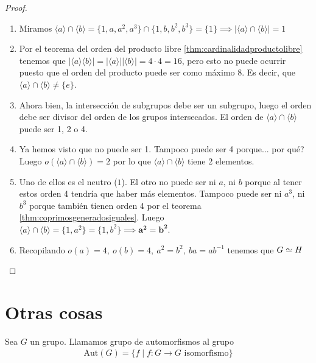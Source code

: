 \documentclass{book}
\theoremstyle{definition}
\theoremstyle{remark}
\newcommand{\inv}[1]{#1^{-1}}
\newcommand{\isom}{\simeq}
\newcommand{\autom}[1]{\text{Aut}(#1)}
\begin{document}
\begin{proof}
\begin{enumerate}
\begin{itemize}
			\begin{enumerate}
				\item Miramos $\langle a \rangle \cap \langle b \rangle = \{1, a, a^2, a^3\} \cap \{1, b, b^2, b^3\} = \{1\} \implies |\langle a \rangle \cap \langle b \rangle| = 1$
				\item Por el teorema del orden del producto libre \ref{thm:cardinalidadproductolibre} tenemos que $|\langle a \rangle \langle b \rangle| = |\langle a \rangle ||\langle b \rangle| = 4 \cdot 4 = 16$, pero esto no puede ocurrir puesto que el orden del producto puede ser como máximo $8$. Es decir, que $\langle a \rangle \cap \langle b \rangle \neq \{e\}$.
				\item Ahora bien, la intersección de subgrupos debe ser un subgrupo, luego el orden debe ser divisor del orden de los grupos intersecados. El orden de $\langle a \rangle \cap \langle b \rangle$ puede ser 1, 2 o 4.
				\item Ya hemos visto que no puede ser 1. Tampoco puede ser 4 porque... por qué? Luego $o(\langle a \rangle \cap \langle b \rangle) = 2$ por lo que $\langle a \rangle \cap \langle b \rangle$ tiene 2 elementos.
				\item Uno de ellos es el neutro ($1$). El otro no puede ser ni $a$, ni $b$ porque al tener estos orden 4 tendría que haber más elementos. Tampoco puede ser ni $a^3$, ni $b^3$ porque también tienen orden 4 por el teorema \ref{thm:coprimosgeneradosiguales}. Luego $\langle a \rangle \cap \langle b \rangle = \{1, a^2\} = \{1, b^2\} \implies \mathbf{a^2 = b^2}$.
				\item Recopilando $o(a) = 4,\ o(b) = 4,\ a^2 = b^2,\ ba = a\inv{b}$ tenemos que $G \isom H \qedhere$
			\end{enumerate}
		\end{itemize}
	\end{enumerate}
\end{proof}


\section{Otras cosas}



\begin{dfn}
	Sea $G$ un grupo. Llamamos grupo de automorfismos al grupo
	\begin{align}
		\autom{G} = \{f \mid f: G \to G \text{ isomorfismo}\}
	\end{align}
\end{dfn}
\end{document}
